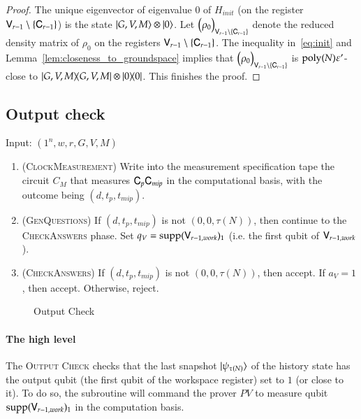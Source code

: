 \begin{proof}
	The unique eigenvector of eigenvalue $0$ of $H_{init}$ (on the register ${\mathsf{V}}_{r-1} \setminus \{ {\mathsf{C}}_{r-1} \}$) is the state $|G,V,M\rangle \otimes |0\rangle$. Let $\Big( \rho_0 \Big)_{{\mathsf{V}}_{r-1} \setminus \{ {\mathsf{C}}_{r-1} \}}$ denote the reduced density matrix of $\rho_0$ on the registers ${\mathsf{V}}_{r-1} \setminus \{ {\mathsf{C}}_{r-1} \}$. The inequality in~\eqref{eq:init} and Lemma~\ref{lem:closeness_to_groundspace} implies that $\Big( \rho_0 \Big)_{{\mathsf{V}}_{r-1} \setminus \{ {\mathsf{C}}_{r-1} \}}$ is $\operatorname{poly}(N) \varepsilon'$-close to $|G,V,M\rangle\! \langle G,V,M| \otimes |0\rangle\! \langle 0|$. This finishes the proof.
\end{proof}

\subsection{Output check}
\label{sec:output_check}


\vspace{10pt}
\begin{center}
\begin{mdframed}
    Input: $(1^n,w,r,G,V,M)$
	\begin{enumerate}
		\item (\textsc{ClockMeasurement}) Write into the measurement specification tape the circuit $C_M$ that measures ${\mathsf{C}}_p {\mathsf{C}}_{mip}$ in the computational basis, with the outcome being $(d,t_p,t_{mip})$.
		
		\item (\textsc{GenQuestions}) If $(d,t_p,t_{mip})$ is not $(0,0,\tau(N))$, then continue to the \textsc{CheckAnswers} phase. Set $q_V = \operatorname{supp}({\mathsf{V}}_{r-1,work})_1$ (i.e. the first qubit of ${\mathsf{V}}_{r-1,work}$).
		\item (\textsc{CheckAnswers}) If $(d,t_p,t_{mip})$ is not $(0,0,\tau(N))$, then accept. If $a_V = 1$, then accept. Otherwise, reject.
	\end{enumerate}    
\end{mdframed}
\end{center}
\begin{figure}[H]
\caption{Output Check}
\label{fig:output_check}
\end{figure}


\paragraph{The high level} The \textsc{Output Check} checks that the last snapshot $|\psi_{\tau(N)}\rangle$ of the history state has the output qubit (the first qubit of the workspace register) set to $1$ (or close to it). To do so, the subroutine will command the prover $PV$ to measure  qubit $\operatorname{supp}({\mathsf{V}}_{r-1,work})_1$ in the computation basis. 

